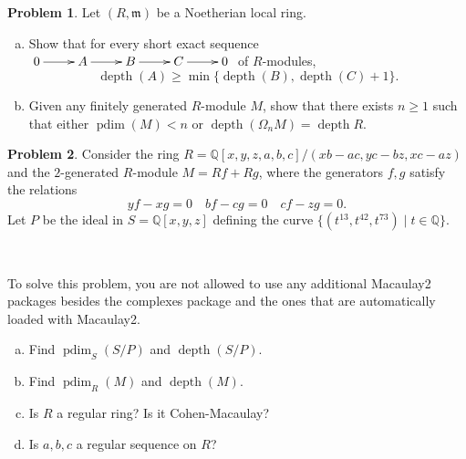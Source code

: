 \documentclass[11pt]{article}
\DeclareMathOperator{\depth}{depth}
\DeclareMathOperator{\pdim}{pdim}
\newcommand{\m}{\mathfrak{m}}
\theoremstyle{definition}
\newtheorem{problem}{Problem}
\begin{document}
\begin{problem}
	Let $(R,\m)$ be a Noetherian local ring.
	\begin{enumerate}[a)]
		\item Show that for every short exact sequence $\xymatrix{0 \ar[r] & A \ar[r] & B \ar[r] & C \ar[r] & 0}$ of $R$-modules,
		$$\depth(A) \geqslant \min \lbrace \depth(B), \depth(C) + 1 \rbrace.$$
		\item Given any finitely generated $R$-module $M$, show that there exists $n \geqslant 1$ such that either $\pdim(M) < n$ or $\depth(\Omega_n M) = \depth R$.
	\end{enumerate}
\end{problem}


\newpage

\setcounter{problem}{6}

\begin{problem}
	Consider the ring $R = \mathbb{Q}[x,y,z,a,b,c]/(xb-ac,yc-bz,xc-az)$ and the $2$-generated $R$-module $M = Rf + Rg$, where the generators $f, g$ satisfy the relations 
		$$yf-xg = 0 \quad bf - cg = 0 \quad cf - zg = 0.$$
		Let $P$ be the ideal in $S = \mathbb{Q}[x,y,z]$ defining the curve $\lbrace (t^{13},t^{42},t^{73}) \mid t \in \mathbb{Q} \rbrace$.

\

To solve this problem, you are not allowed to use any additional Macaulay2 packages besides the complexes package and the ones that are automatically loaded with Macaulay2.

\begin{enumerate}[a)]
	\item Find $\pdim_S(S/P)$ and $\depth(S/P)$. 
	\item Find $\pdim_R(M)$ and $\depth(M)$.
	\item Is $R$ a regular ring? Is it Cohen-Macaulay?
	\item Is $a,b,c$ a regular sequence on $R$?
\end{enumerate}
\end{problem}
\end{document}
